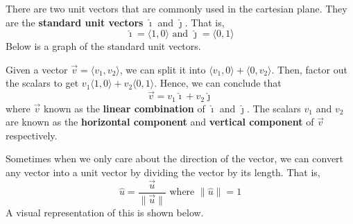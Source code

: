 \documentclass{report}
\begin{document}
There are two unit vectors that are commonly used in the cartesian plane. They
are the \textbf{standard unit vectors} $\hat{\imath}$ and $\hat{\jmath}$. That
is, \[\hat{\imath} = \langle 1, 0 \rangle \text{ and } \hat{\jmath} = \langle 0, 1 \rangle\]
Below is a graph of the standard unit vectors.
\begin{center}
\end{center}
Given a vector $\vec{v} = \langle v_1, v_2 \rangle$, we can split it into $\langle v_1, 0 \rangle + \langle 0, v_2 \rangle$. Then, factor out the scalars to get $v_1\langle 1, 0 \rangle + v_2\langle 0, 1 \rangle$. Hence, we can conclude that \[\vec{v} = v_1\hat{\imath} + v_2\hat{\jmath}\] where $\vec{v}$ known as the \textbf{linear combination} of $\hat{\imath}$ and
$\hat{\jmath}$. The scalars $v_1$ and $v_2$ are known as the \textbf{horizontal
    component} and \textbf{vertical component} of $\vec{v}$ respectively.

Sometimes when we only care about the direction of the vector, we can convert
any vector into a unit vector by dividing the vector by its length. That is, \[\hat{u} = \frac{\vec{u}}{\lVert \vec{u} \rVert} \text{ where } \lVert \hat{u} \rVert = 1\]
A visual representation of this is shown below.
\begin{center}
\end{center}
\end{document}
